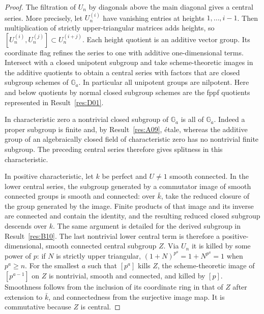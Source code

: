 \documentclass[11pt,a4paper,openany,oneside]{book}
\theoremstyle{resultstyle}
\theoremstyle{definition}
\numberwithin{equation}{chapter}
\begin{document}
\begin{proof}
The filtration of \(U_n\) by diagonals above the main diagonal gives
a central series. More precisely, let \(U_n^{(i)}\) have vanishing
entries at heights \(1,\ldots,i-1\). Then multiplication of strictly
upper-triangular matrices adds heights, so
\([U_n^{(i)},U_n^{(j)}]\subset U_n^{(i+j)}\). Each height quotient
is an additive vector group. Its coordinate flag refines the series
to one with additive one-dimensional terms. Intersect with a
closed unipotent subgroup and take scheme-theoretic images in the
additive quotients to obtain a central series with factors that
are closed subgroup schemes of \(\mathbb G_a\). In particular all
unipotent groups are nilpotent. Here and below quotients by normal
closed subgroup schemes are the fppf quotients represented in
Result~\ref{res:D01}.

In characteristic zero a nontrivial closed subgroup of \(\mathbb G_a\)
is all of \(\mathbb G_a\). Indeed a proper subgroup is finite
and, by Result~\ref{res:A09}, étale, whereas the additive group of
an algebraically closed field of characteristic zero has no
nontrivial finite subgroup. The preceding central series therefore
gives splitness in this characteristic.

In positive characteristic, let \(k\) be perfect and \(U\ne1\) smooth
connected. In the lower central series, the subgroup generated by a
commutator image of smooth connected groups is smooth and connected:
over \(\bar k\), take the reduced closure of the group generated by
the image. Finite products of that image and its inverse are connected
and contain the identity, and the resulting reduced closed subgroup
descends over \(k\). The same argument is detailed for the derived
subgroup in Result~\ref{res:B10}. The last nontrivial lower central
term is therefore a positive-dimensional, smooth connected central
subgroup \(Z\). Via \(U_n\) it is killed by some power of \(p\):
if \(N\) is strictly upper triangular,
\((1+N)^{p^a}=1+N^{p^a}=1\) when \(p^a\ge n\).
For the smallest \(a\) such that \([p^a]\) kills \(Z\), the
scheme-theoretic image of \([p^{a-1}]\) on \(Z\) is nontrivial,
smooth and connected, and killed by \([p]\). Smoothness follows
from the inclusion of its coordinate ring in that of \(Z\) after
extension to \(\bar k\), and connectedness from the surjective
image map. It is commutative because \(Z\) is central.


\end{proof}
\end{document}
